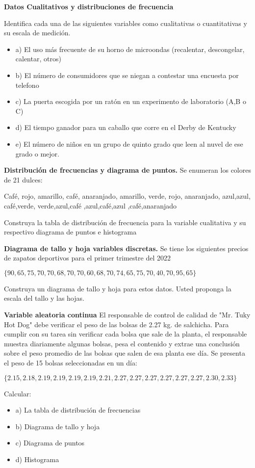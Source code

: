 \documentclass{oxmathproblems}
\begin{document}
\begin{questions}

\miquestion \textbf{Datos Cualitativos y distribuciones de frecuencia}

Identifica cada una de las siguientes variables como cualitativas o cuantitativas y su escala de medición. 
\begin{itemize}
\item a) El uso más frecuente de su horno de microondas (recalentar, descongelar, calentar, otros)

\item b) El número de consumidores que se niegan a contestar una encuesta por telefono 

\item c) La puerta escogida por un ratón en un experimento de laboratorio (A,B o C)

\item d) El tiempo ganador para un caballo que corre en el Derby de Kentucky 

\item e) El número de niños en un grupo de quinto grado que leen al nuvel de ese grado o mejor. 
\end{itemize}

\miquestion \textbf{Distribución de frecuencias y diagrama de puntos.}
Se enumeran los colores de 21 dulces: 

{Café,
rojo,
amarillo,
café,
anaranjado,
amarillo,
verde,
rojo,
anaranjado,
azul,azul,
café,verde,
verde,azul,café
,azul,café,azul
,café,anaranjado}


Construya la tabla de distribución de frecuencia para la variable cualitativa y su respectivo diagrama de puntos e histograma

\miquestion \textbf{Diagrama de tallo y hoja variables discretas.}
Se tiene los siguientes precios de zapatos deportivos para el primer trimestre del 2022

$\{90,65,75,70,70,68,70,70,60,68,70,74,65,75,70,40,70,95,65\}$

Construya un diagrama de tallo y hoja para estos datos. Usted proponga la escala del tallo y las hojas.

\miquestion \textbf{Variable aleatoria continua}
El responsable de control de calidad de "Mr. Tuky Hot Dog" debe verificar el peso de las bolsas de 2.27 kg. de salchicha. Para cumplir con su tarea sin verificar cada bolsa que sale de la planta, el responsable muestra diariamente algunas bolsas, pesa el contenido y extrae una conclusión sobre el peso promedio de las bolsas que salen de esa planta ese día. 
Se presenta el peso de 15 bolsas seleccionadas en un día: 

$\{2.15,2.18,2.19,2.19,2.19,2.19,2.21,2.27,2.27,2.27,2.27,2.27,2.27,2.30,2.33\}$

Calcular: 
\begin{itemize}
\item a) La tabla de distribución de frecuencias
\item b) Diagrama de tallo y hoja
\item c) Diagrama de puntos 
\item d) Histograma 
\end{itemize}

\end{questions}
\end{document}
